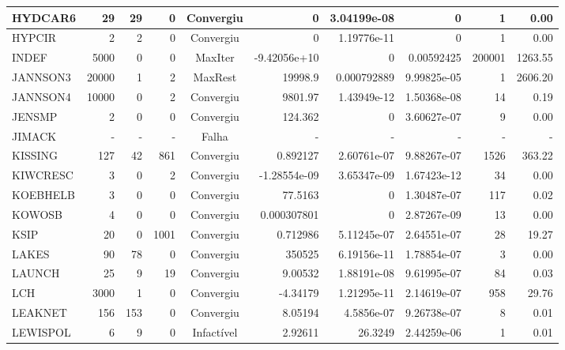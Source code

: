 \begin{center}
\begin{longtable}{|l|r|r|r|c|r|r|r|r|r|}
 HYDCAR6 &     29 &     29 &      0 & Convergiu  &           0 &    3.04199e-08 &           0 &      1 &    0.00 \\ \hline
  HYPCIR &      2 &      2 &      0 & Convergiu  &           0 &    1.19776e-11 &           0 &      1 &    0.00 \\ \hline
   INDEF &   5000 &      0 &      0 & MaxIter    & -9.42056e+10 &              0 &  0.00592425 & 200001 & 1263.55 \\ \hline
JANNSON3 &  20000 &      1 &      2 & MaxRest    &     19998.9 &    0.000792889 & 9.99825e-05 &      1 & 2606.20 \\ \hline
JANNSON4 &  10000 &      0 &      2 & Convergiu  &     9801.97 &    1.43949e-12 & 1.50368e-08 &     14 &    0.19 \\ \hline
  JENSMP &      2 &      0 &      0 & Convergiu  &     124.362 &              0 & 3.60627e-07 &      9 &    0.00 \\ \hline
JIMACK & - & - & - & Falha & - & - & - & - & - \\ \hline
 KISSING &    127 &     42 &    861 & Convergiu  &    0.892127 &    2.60761e-07 & 9.88267e-07 &   1526 &  363.22 \\ \hline
KIWCRESC &      3 &      0 &      2 & Convergiu  & -1.28554e-09 &    3.65347e-09 & 1.67423e-12 &     34 &    0.00 \\ \hline
KOEBHELB &      3 &      0 &      0 & Convergiu  &     77.5163 &              0 & 1.30487e-07 &    117 &    0.02 \\ \hline
  KOWOSB &      4 &      0 &      0 & Convergiu  & 0.000307801 &              0 & 2.87267e-09 &     13 &    0.00 \\ \hline
    KSIP &     20 &      0 &   1001 & Convergiu  &    0.712986 &    5.11245e-07 & 2.64551e-07 &     28 &   19.27 \\ \hline
   LAKES &     90 &     78 &      0 & Convergiu  &      350525 &    6.19156e-11 & 1.78854e-07 &      3 &    0.00 \\ \hline
  LAUNCH &     25 &      9 &     19 & Convergiu  &     9.00532 &    1.88191e-08 & 9.61995e-07 &     84 &    0.03 \\ \hline
     LCH &   3000 &      1 &      0 & Convergiu  &    -4.34179 &    1.21295e-11 & 2.14619e-07 &    958 &   29.76 \\ \hline
 LEAKNET &    156 &    153 &      0 & Convergiu  &     8.05194 &     4.5856e-07 & 9.26738e-07 &      8 &    0.01 \\ \hline
LEWISPOL &      6 &      9 &      0 & Infactível &     2.92611 &        26.3249 & 2.44259e-06 &      1 &    0.01 \\ \hline

\end{longtable}
\end{center}
